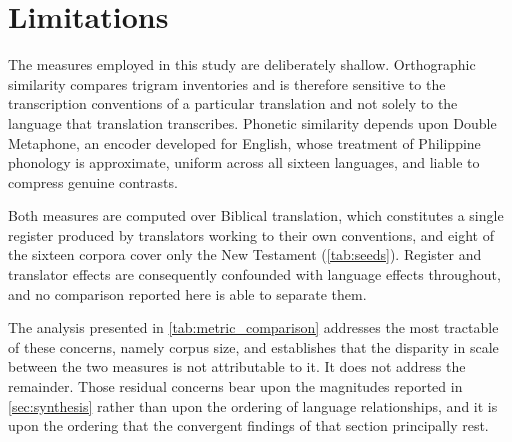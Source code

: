 \section{Limitations}\label{sec:limitations}

The measures employed in this study are deliberately shallow. Orthographic
similarity compares trigram inventories and is therefore sensitive to the
transcription conventions of a particular translation and not solely to the
language that translation transcribes. Phonetic similarity depends upon Double
Metaphone, an encoder developed for English, whose treatment of Philippine
phonology is approximate, uniform across all sixteen languages, and liable to
compress genuine contrasts.

Both measures are computed over Biblical translation, which constitutes a single
register produced by translators working to their own conventions, and eight of
the sixteen corpora cover only the New Testament (\cref{tab:seeds}). Register
and translator effects are consequently confounded with language effects
throughout, and no comparison reported here is able to separate them.

The analysis presented in \cref{tab:metric_comparison} addresses the most
tractable of these concerns, namely corpus size, and establishes that the
disparity in scale between the two measures is not attributable to it. It does
not address the remainder. Those residual concerns bear upon the magnitudes
reported in \cref{sec:synthesis} rather than upon the ordering of language
relationships, and it is upon the ordering that the convergent findings of that
section principally rest.

